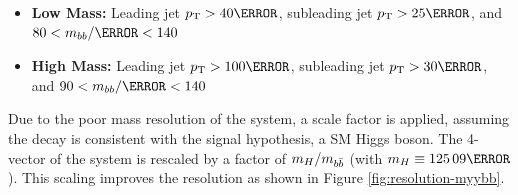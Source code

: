\begin{itemize}
  \item \textbf{Low Mass:} Leading jet $\pt > \unit{40}{\GeV}$, subleading jet $\pt > \unit{25}{\GeV}$, and $80 < m_{bb}/\GeV < 140$
  \item \textbf{High Mass:} Leading jet $\pt > \unit{100}{\GeV}$, subleading jet $\pt > \unit{30}{\GeV}$, and $90 < m_{bb}/\GeV < 140$
\end{itemize}

Due to the poor mass resolution of the \bb system, a scale factor is applied, assuming the decay is consistent with the signal hypothesis, a \gls{SM} Higgs boson. The 4-vector of the system is rescaled by a factor of $m_{H}/m_{b\bar{b}}$ (with $m_H \equiv \unit{125.09}{\GeV}$). This scaling improves the \myybb resolution as shown in Figure \ref{fig:resolution-myybb}.


